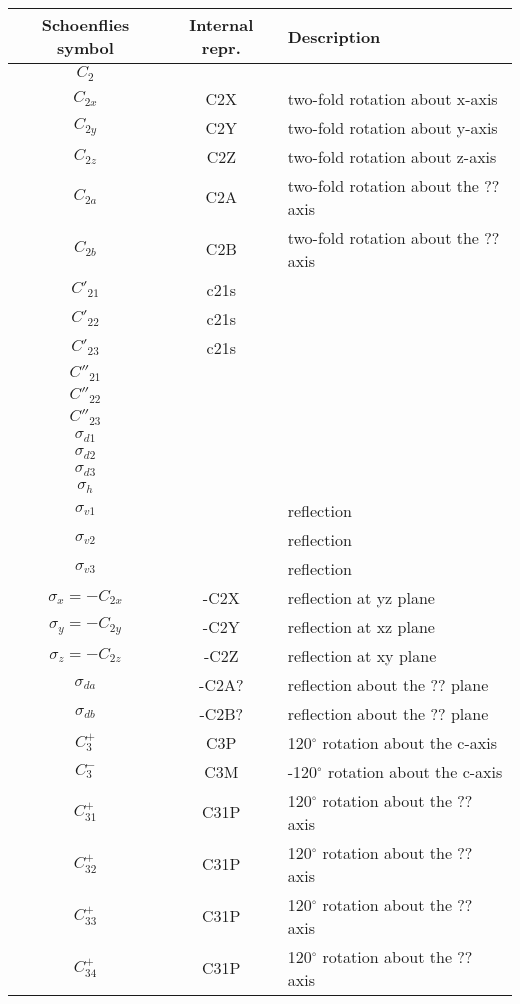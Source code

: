 \documentclass[11pt,a4paper]{report}
\begin{document}
\begin{center}
\begin{tabular}{|c|c|l|}
\hline
Schoenflies symbol & Internal repr. & Description\\
\hline
$C_2$ & & \\
$C_{2x}$   & C2X  & two-fold rotation about x-axis\\
$C_{2y}$   & C2Y  & two-fold rotation about y-axis \\
$C_{2z}$   & C2Z  &two-fold rotation about z-axis \\
$C_{2a}$    & C2A & two-fold rotation about the ?? axis\\ 
$C_{2b}$    & C2B & two-fold rotation about the ?? axis\\ 
$C'_{21}$ & c21s & \\
$C'_{22}$ & c21s & \\
$C'_{23}$ & c21s & \\
$C''_{21}$ & & \\
$C''_{22}$ & & \\
$C''_{23}$ & & \\
\hline
$\sigma_{d1}$ & & \\
$\sigma_{d2}$ & & \\
$\sigma_{d3}$ & & \\
$\sigma_h$ & & \\
$\sigma_{v1}$& & reflection\\
$\sigma_{v2}$& & reflection\\
$\sigma_{v3}$& & reflection\\
$\sigma_x=-C_{2x}$ & -C2X &  reflection at yz plane\\
$\sigma_y=-C_{2y}$ & -C2Y & reflection at xz plane \\
$\sigma_z=-C_{2z}$ & -C2Z & reflection at xy plane\\
$\sigma_{da}$ & -C2A? &  reflection about the ?? plane\\
$\sigma_{db}$ & -C2B?&  reflection about the ?? plane\\
\hline
$C_{3}^+ $  & C3P & 120$^\circ$ rotation about the c-axis\\
$C_{3}^- $  & C3M & -120$^\circ$ rotation about the c-axis\\
$C_{31}^+ $ & C31P & 120$^\circ$ rotation about the ?? axis\\
$C_{32}^+ $ & C31P & 120$^\circ$ rotation about the ?? axis\\
$C_{33}^+ $ & C31P & 120$^\circ$ rotation about the ?? axis\\
$C_{34}^+ $ & C31P & 120$^\circ$ rotation about the ?? axis\\

\end{tabular}
\end{center}
\end{document}
